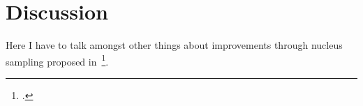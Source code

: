 \section{Discussion}
\label{ch:discussion}

Here I have to talk amongst other things about improvements through nucleus sampling proposed in~\footcite{DBLP:journals/corr/abs-1904-09751}.